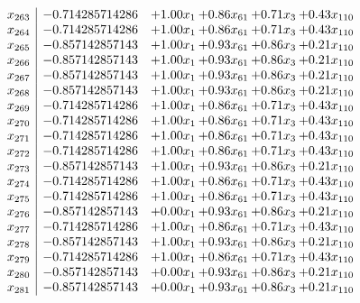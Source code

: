 \documentclass[8pt]{article}
\begin{document}
\[\begin{array}{c| c c@{\hskip 2pt} c@{\hskip 2pt} c@{\hskip 2pt} c@{\hskip 2pt} }
 x_{263}   &  -0.714285714286 & +  1.00 x_{1} & +  0.86 x_{61} & +  0.71 x_{3} & +  0.43 x_{110}\\
 x_{264}   &  -0.714285714286 & +  1.00 x_{1} & +  0.86 x_{61} & +  0.71 x_{3} & +  0.43 x_{110}\\
 x_{265}   &  -0.857142857143 & +  1.00 x_{1} & +  0.93 x_{61} & +  0.86 x_{3} & +  0.21 x_{110}\\
 x_{266}   &  -0.857142857143 & +  1.00 x_{1} & +  0.93 x_{61} & +  0.86 x_{3} & +  0.21 x_{110}\\
 x_{267}   &  -0.857142857143 & +  1.00 x_{1} & +  0.93 x_{61} & +  0.86 x_{3} & +  0.21 x_{110}\\
 x_{268}   &  -0.857142857143 & +  1.00 x_{1} & +  0.93 x_{61} & +  0.86 x_{3} & +  0.21 x_{110}\\
 x_{269}   &  -0.714285714286 & +  1.00 x_{1} & +  0.86 x_{61} & +  0.71 x_{3} & +  0.43 x_{110}\\
 x_{270}   &  -0.714285714286 & +  1.00 x_{1} & +  0.86 x_{61} & +  0.71 x_{3} & +  0.43 x_{110}\\
 x_{271}   &  -0.714285714286 & +  1.00 x_{1} & +  0.86 x_{61} & +  0.71 x_{3} & +  0.43 x_{110}\\
 x_{272}   &  -0.714285714286 & +  1.00 x_{1} & +  0.86 x_{61} & +  0.71 x_{3} & +  0.43 x_{110}\\
 x_{273}   &  -0.857142857143 & +  1.00 x_{1} & +  0.93 x_{61} & +  0.86 x_{3} & +  0.21 x_{110}\\
 x_{274}   &  -0.714285714286 & +  1.00 x_{1} & +  0.86 x_{61} & +  0.71 x_{3} & +  0.43 x_{110}\\
 x_{275}   &  -0.714285714286 & +  1.00 x_{1} & +  0.86 x_{61} & +  0.71 x_{3} & +  0.43 x_{110}\\
 x_{276}   &  -0.857142857143 & +  0.00 x_{1} & +  0.93 x_{61} & +  0.86 x_{3} & +  0.21 x_{110}\\
 x_{277}   &  -0.714285714286 & +  1.00 x_{1} & +  0.86 x_{61} & +  0.71 x_{3} & +  0.43 x_{110}\\
 x_{278}   &  -0.857142857143 & +  1.00 x_{1} & +  0.93 x_{61} & +  0.86 x_{3} & +  0.21 x_{110}\\
 x_{279}   &  -0.714285714286 & +  1.00 x_{1} & +  0.86 x_{61} & +  0.71 x_{3} & +  0.43 x_{110}\\
 x_{280}   &  -0.857142857143 & +  0.00 x_{1} & +  0.93 x_{61} & +  0.86 x_{3} & +  0.21 x_{110}\\
 x_{281}   &  -0.857142857143 & +  0.00 x_{1} & +  0.93 x_{61} & +  0.86 x_{3} & +  0.21 x_{110}\\

\end{array}\]
\end{document}
